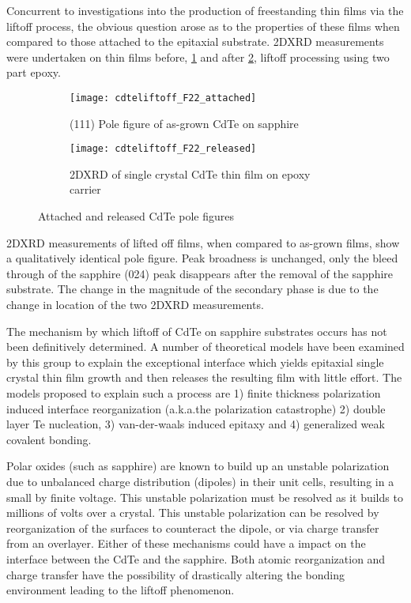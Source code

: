 Concurrent to investigations into the production of freestanding thin films via the liftoff process, the obvious question arose as to the properties of these films when compared to those attached to the epitaxial substrate.
2DXRD measurements were undertaken on thin films before, \cref{fig:cdteliftoff_F22_attached} and after \cref{fig:cdteliftoff_F22_released}, liftoff processing using two part epoxy.
\begin{figure}
 \centering
 \begin{subfigure}[b]{0.45\textwidth}
  \centering \texttt{[image: cdteliftoff\_F22\_attached]}
  \caption{\label{fig:cdteliftoff_F22_attached}(111) Pole figure of as-grown CdTe on sapphire}
 \end{subfigure}%
 \begin{subfigure}[b]{0.45\textwidth}
  \centering \texttt{[image: cdteliftoff\_F22\_released]}
  \caption{\label{fig:cdteliftoff_F22_released}2DXRD of single crystal CdTe thin film on epoxy carrier}
 \end{subfigure}%
 \caption{\label{fig:cdteliftoff_2DXRD}Attached and released CdTe pole figures}
\end{figure}
2DXRD measurements of lifted off films, when compared to as-grown films, show a qualitatively identical pole figure.
Peak broadness is unchanged, only the bleed through of the sapphire (024) peak disappears after the removal of the sapphire substrate.
The change in the magnitude of the secondary phase is due to the change in location of the two 2DXRD measurements.

The mechanism by which liftoff of CdTe on sapphire substrates occurs has not been definitively determined.
A number of theoretical models have been examined by this group to explain the exceptional interface which yields epitaxial single crystal thin film growth and then releases the resulting film with little effort.
The models proposed to explain such a process are 1) finite thickness polarization induced interface reorganization (a.k.a.the polarization catastrophe) 2) double layer Te nucleation, 3) van-der-waals induced epitaxy and 4) generalized weak covalent bonding.

Polar oxides (such as sapphire) are known to build up an unstable polarization due to unbalanced charge distribution (dipoles) in their unit cells, resulting in a small by finite voltage.
This unstable polarization must be resolved as it builds to millions of volts over a crystal.
This unstable polarization can be resolved by reorganization of the surfaces to counteract the dipole, or via charge transfer from an overlayer.
Either of these mechanisms could have a impact on the interface between the CdTe and the sapphire.
Both atomic reorganization and charge transfer have the possibility of drastically altering the bonding environment leading to the liftoff phenomenon.

